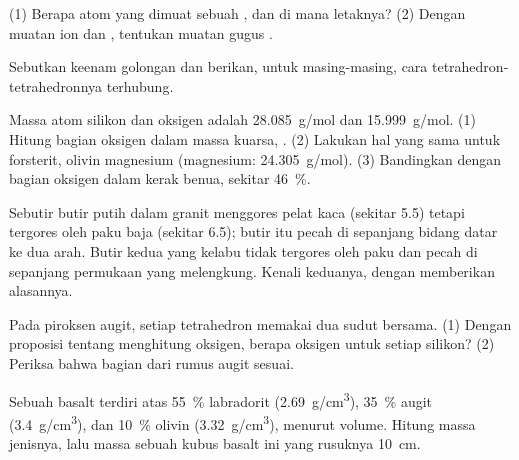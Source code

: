 \begin{exercise}[$\star$]\label{exo:g11:minerals:4}
(1) Berapa atom yang dimuat sebuah , dan di mana
letaknya? (2) Dengan muatan ion  dan , tentukan
muatan gugus .
\end{exercise}

\begin{exercise}[$\star$]\label{exo:g11:minerals:5}
Sebutkan keenam golongan  dan berikan, untuk
masing-masing, cara tetrahedron-tetrahedronnya terhubung.
\end{exercise}

\begin{exercise}[$\star\star$]\label{exo:g11:minerals:6}
Massa atom silikon dan oksigen adalah \qty{28.085}{g/mol} dan
\qty{15.999}{g/mol}. (1) Hitung bagian oksigen dalam massa kuarsa, .
(2) Lakukan hal yang sama untuk forsterit, olivin magnesium
 (magnesium: \qty{24.305}{g/mol}). (3) Bandingkan dengan bagian
oksigen dalam kerak benua, sekitar \qty{46}{\percent}.
\end{exercise}

\begin{exercise}[$\star\star$]\label{exo:g11:minerals:7}
Sebutir butir putih dalam granit menggores pelat kaca (sekitar 5.5) tetapi
tergores oleh paku baja (sekitar 6.5); butir itu pecah di sepanjang bidang datar
ke dua arah. Butir kedua yang kelabu tidak tergores oleh paku dan pecah di
sepanjang permukaan yang melengkung. Kenali keduanya, dengan memberikan
alasannya.
\end{exercise}

\begin{exercise}[$\star\star$]\label{exo:g11:minerals:8}
Pada piroksen augit, setiap tetrahedron memakai dua sudut bersama. (1) Dengan
proposisi tentang menghitung oksigen, berapa oksigen untuk setiap silikon?
(2) Periksa bahwa bagian  dari rumus augit
sesuai.
\end{exercise}

\begin{exercise}[$\star\star$]\label{exo:g11:minerals:9}
Sebuah basalt terdiri atas \qty{55}{\percent} labradorit (\qty{2.69}{g/cm^3}),
\qty{35}{\percent} augit (\qty{3.4}{g/cm^3}), dan \qty{10}{\percent} olivin
(\qty{3.32}{g/cm^3}), menurut volume. Hitung massa jenisnya, lalu massa sebuah
kubus basalt ini yang rusuknya \qty{10}{cm}.
\end{exercise}

